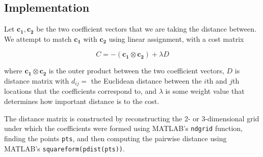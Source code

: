 \documentclass[../tech_report_1.tex]{subfiles}
\begin{document}
\subsection{Implementation}

Let $\bm{c_1}, \bm{c_2}$ be the two coefficient vectors that we are taking the distance between. We attempt to match $\bm{c_1}$ with $\bm{c_2}$ using linear assignment, with a cost matrix

\begin{equation} C = -(\bm{c_1} \otimes \bm{c_2}) + \lambda D\end{equation}

where $\bm{c_1} \otimes \bm{c_2}$ is the outer product between the two coefficient vectors, $D$ is distance matrix with $d_{ij}=$ the Euclidean distance between the $i$th and $j$th locations that the coefficients correspond to, and $\lambda$ is some weight value that determines how important distance is to the cost.

The distance matrix is constructed by reconstructing the 2- or 3-dimensional grid under which the coefficients were formed using MATLAB's \texttt{ndgrid} function, finding the points \texttt{pts}, and then computing the pairwise distance using MATLAB's \texttt{squareform(pdist(pts))}.

\end{document}
